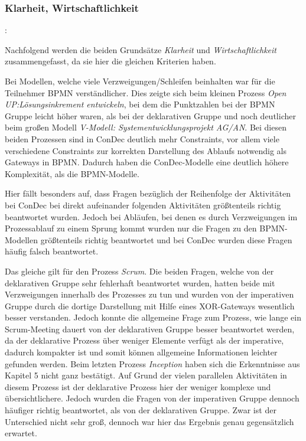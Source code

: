 \subsubsection{Klarheit, Wirtschaftlichkeit}: 

Nachfolgend werden die beiden Grundsätze \textit{Klarheit} und \textit{Wirtschaftlichkeit} zusammengefasst, da sie hier die gleichen Kriterien haben.\newline

Bei Modellen, welche viele Verzweigungen/Schleifen beinhalten war für die Teilnehmer BPMN verständlicher. Dies zeigte sich beim kleinen Prozess \textit{Open UP:Lösungsinkrement entwickeln}, bei dem die Punktzahlen bei der BPMN Gruppe leicht höher waren, als bei der deklarativen Gruppe und noch deutlicher beim großen Modell \textit{V-Modell: Systementwicklungsprojekt AG/AN}. Bei diesen beiden Prozessen sind in ConDec deutlich mehr Constraints, vor allem viele verschiedene Constraints zur korrekten Darstellung des Ablaufs notwendig als Gateways in BPMN. Dadurch haben die ConDec-Modelle eine deutlich höhere Komplexität, als die BPMN-Modelle.\newline

Hier fällt besonders auf, dass Fragen bezüglich der Reihenfolge der Aktivitäten bei ConDec bei direkt aufeinander folgenden Aktivitäten größtenteils richtig beantwortet wurden. Jedoch bei Abläufen, bei denen es durch Verzweigungen im Prozessablauf zu einem Sprung kommt wurden nur die Fragen zu den BPMN-Modellen größtenteils richtig beantwortet und bei ConDec wurden diese Fragen häufig falsch beantwortet.\newline

Das gleiche gilt für den Prozess \textit{Scrum}. Die beiden Fragen, welche von der deklarativen Gruppe sehr fehlerhaft beantwortet wurden, hatten beide mit Verzweigungen innerhalb des Prozesses zu tun und wurden von der imperativen Gruppe durch die dortige Darstellung mit Hilfe eines XOR-Gateways wesentlich besser verstanden. Jedoch konnte die allgemeine Frage zum Prozess, wie lange ein Scrum-Meeting dauert von der deklarativen Gruppe besser beantwortet werden, da der deklarative Prozess über weniger Elemente verfügt als der imperative, dadurch kompakter ist und somit können allgemeine Informationen leichter gefunden werden. \newline
Beim letzten Prozess \textit{Inception} haben sich die Erkenntnisse aus Kapitel 5 nicht ganz bestätigt. Auf Grund der vielen parallelen Aktivitäten in diesem Prozess ist der deklarative Prozess hier der weniger komplexe und übersichtlichere. Jedoch wurden die Fragen von der imperativen Gruppe dennoch häufiger richtig beantwortet, als von der deklarativen Gruppe. Zwar ist der Unterschied nicht sehr groß, dennoch war hier das Ergebnis genau gegensätzlich erwartet.\newline

